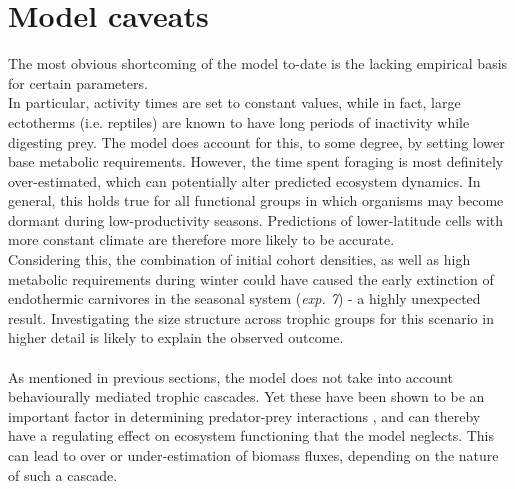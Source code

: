 \section{Model caveats}
The most obvious shortcoming of the model to-date is the lacking empirical basis for certain parameters. \\
In particular, activity times are set to constant values, while in fact, large ectotherms (i.e. reptiles) are known to have long periods of inactivity while digesting prey. 
The model does account for this, to some degree, by setting lower base metabolic requirements. However, the time spent foraging is most definitely over-estimated, which can potentially alter predicted ecosystem dynamics. 
In general, this holds true for all functional groups in which organisms may become dormant during low-productivity seasons. Predictions of lower-latitude cells with more constant climate are therefore more likely to be accurate. \\
Considering this, the combination of initial cohort densities, as well as high metabolic requirements during winter could have  caused the early extinction of endothermic carnivores in the seasonal system (\textit{exp. 7}) - a highly unexpected result. Investigating the size structure across trophic groups for this scenario in higher detail is likely to explain the observed outcome.
\\\\
As mentioned in previous sections, the model does not take into account behaviourally mediated trophic cascades. Yet these have been shown to be an important factor in determining predator-prey interactions \citep[e.g][]{Fortin2005,Duffy2007,Beschta2009}, and can thereby have a regulating effect on ecosystem functioning that the model neglects. This can lead to over or under-estimation of biomass fluxes, depending on the nature of such a cascade.\\ 
